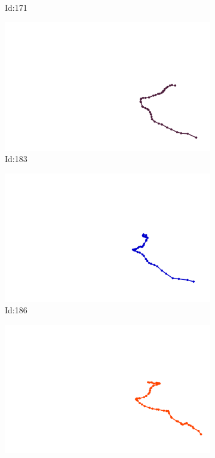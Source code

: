 \documentclass[12pt,twoside]{report}
\begin{document}
\begin{figure}
\begin{subfigure}[b]{0.20\textwidth}
\caption{Id:171}
\end{subfigure}
\begin{subfigure}[b]{0.20\textwidth}
\centering
\includegraphics[width=\textwidth]{../trajectories/183.png}
\caption{Id:183}
\end{subfigure}
\begin{subfigure}[b]{0.20\textwidth}
\centering
\includegraphics[width=\textwidth]{../trajectories/186.png}
\caption{Id:186}
\end{subfigure}
\begin{subfigure}[b]{0.20\textwidth}
\centering
\includegraphics[width=\textwidth]{../trajectories/258.png}

\end{subfigure}
\end{figure}
\end{document}
